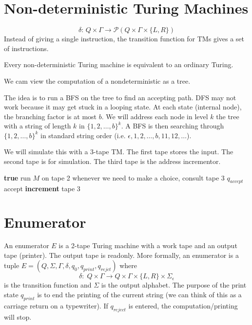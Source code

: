 \section{Non-deterministic Turing Machines}

$$
\delta:\, Q \times \Gamma \to \mathcal{P}(Q \times \Gamma \times \{L,R\})
$$
Instead of giving a single instruction, the transition function for TMs gives a set of instructions.

\begin{theorem}
    Every non-deterministic Turing machine is equivalent to an ordinary Turing.
\end{theorem}

We cam view the computation of a nondeterministic as a tree.

The idea is to run a BFS on the tree to find an accepting path. DFS may not work because it may get stuck in a looping state. At each state (internal node), the branching factor is at most $b$. We will address each node in level $k$ the tree with a string of length $k$ in $\{1,2,\ldots,b\}^k$. A BFS is then searching through $\{1,2,\ldots,b\}^k$ in standard string order (i.e. $\epsilon,1,2,\ldots,b,11,12,\ldots$).

We will simulate this with a 3-tape TM. The first tape stores the input. The second tape is for simulation. The third tape is the address incrementor.

\begin{codebox}
    \li \While \textbf{true} \Do
        \li run $M$ on tape 2
        \li whenever we need to make a choice, consult tape 3
        \li \If $q_{accept}$ accept
        \li \textbf{increment} tape 3
\end{codebox}

\section{Enumerator}

An enumerator $E$ is a 2-tape Turing machine with a work tape and an output tape (printer). The output tape is readonly. More formally, an enumerator is a tuple $E = (Q,\Sigma,\Gamma,\delta,q_0,q_{print},q_{rejct})$ where
$$
\delta:\;Q \times \Gamma \to Q \times \Gamma \times \{L,R\} \times \Sigma_{\epsilon}
$$
is the transition function and $\Sigma$ is the output alphabet. The purpose of the print state $q_{print}$ is to end the printing of the current string (we can think of this as a carriage return on a typewriter). If $q_{reject}$ is entered, the computation/printing will stop.

